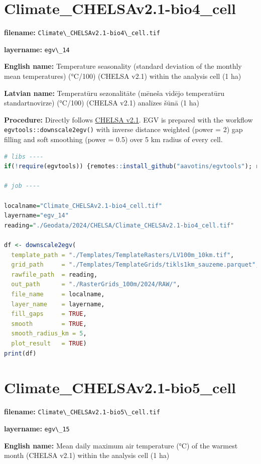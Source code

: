 \documentclass[
]{book}
\newcommand{\passthrough}[1]{#1}
\begin{document}
\section{Climate\_CHELSAv2.1-bio4\_cell}\label{ch06.014}

\textbf{filename:} \passthrough{\lstinline!Climate\_CHELSAv2.1-bio4\_cell.tif!}

\textbf{layername:} \passthrough{\lstinline!egv\_14!}

\textbf{English name:} Temperature seasonality (standard deviation of the monthly mean temperatures) (°C/100) (CHELSA v2.1) within the analysis cell (1 ha)

\textbf{Latvian name:} Temperatūru sezonalitāte (mēneša vidējo temperatūru standartnovirze) (°C/100) (CHELSA v2.1) analīzes šūnā (1 ha)

\textbf{Procedure:} Directly follows \hyperref[Ch04.11]{CHELSA v2.1}. EGV is prepared with the
workflow \passthrough{\lstinline!egvtools::downscale2egv()!} with inverse distance weighted (power = 2)
gap filling and soft smoothing (power = 0.5) over 5 km radius of every cell.

\begin{lstlisting}[language=R]
# libs ----
if(!require(egvtools)) {remotes::install_github("aavotins/egvtools"); require(egvtools)}

# job ----

localname="Climate_CHELSAv2.1-bio4_cell.tif"
layername="egv_14"
reading="./Geodata/2024/CHELSA/Climate_CHELSAv2.1-bio4_cell.tif"

df <- downscale2egv(
  template_path = "./Templates/TemplateRasters/LV100m_10km.tif",
  grid_path     = "./Templates/TemplateGrids/tikls1km_sauzeme.parquet",
  rawfile_path  = reading,
  out_path      = "./RasterGrids_100m/2024/RAW/",
  file_name     = localname,
  layer_name    = layername,
  fill_gaps     = TRUE,
  smooth        = TRUE,
  smooth_radius_km = 5,
  plot_result   = TRUE)
print(df)
\end{lstlisting}

\section{Climate\_CHELSAv2.1-bio5\_cell}\label{ch06.015}

\textbf{filename:} \passthrough{\lstinline!Climate\_CHELSAv2.1-bio5\_cell.tif!}

\textbf{layername:} \passthrough{\lstinline!egv\_15!}

\textbf{English name:} Mean daily maximum air temperature (°C) of the warmest month (CHELSA v2.1) within the analysis cell (1 ha)
\end{document}
